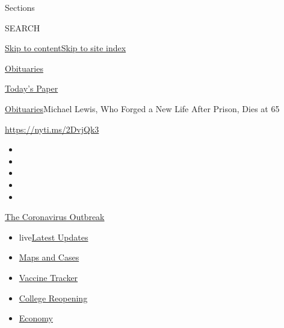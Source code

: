 Sections

SEARCH

\protect\hyperlink{site-content}{Skip to
content}\protect\hyperlink{site-index}{Skip to site index}

\href{https://www.nytimes3xbfgragh.onion/section/obituaries}{Obituaries}

\href{https://myaccount.nytimes3xbfgragh.onion/auth/login?response_type=cookie\&client_id=vi}{}

\href{https://www.nytimes3xbfgragh.onion/section/todayspaper}{Today's
Paper}

\href{/section/obituaries}{Obituaries}\textbar{}Michael Lewis, Who
Forged a New Life After Prison, Dies at 65

\url{https://nyti.ms/2DvjQk3}

\begin{itemize}
\item
\item
\item
\item
\item
\end{itemize}

\href{https://www.nytimes3xbfgragh.onion/news-event/coronavirus?action=click\&pgtype=Article\&state=default\&region=TOP_BANNER\&context=storylines_menu}{The
Coronavirus Outbreak}

\begin{itemize}
\tightlist
\item
  live\href{https://www.nytimes3xbfgragh.onion/2020/08/04/world/coronavirus-covid-19.html?action=click\&pgtype=Article\&state=default\&region=TOP_BANNER\&context=storylines_menu}{Latest
  Updates}
\item
  \href{https://www.nytimes3xbfgragh.onion/interactive/2020/us/coronavirus-us-cases.html?action=click\&pgtype=Article\&state=default\&region=TOP_BANNER\&context=storylines_menu}{Maps
  and Cases}
\item
  \href{https://www.nytimes3xbfgragh.onion/interactive/2020/science/coronavirus-vaccine-tracker.html?action=click\&pgtype=Article\&state=default\&region=TOP_BANNER\&context=storylines_menu}{Vaccine
  Tracker}
\item
  \href{https://www.nytimes3xbfgragh.onion/2020/08/02/us/covid-college-reopening.html?action=click\&pgtype=Article\&state=default\&region=TOP_BANNER\&context=storylines_menu}{College
  Reopening}
\item
  \href{https://www.nytimes3xbfgragh.onion/live/2020/08/03/business/stock-market-today-coronavirus?action=click\&pgtype=Article\&state=default\&region=TOP_BANNER\&context=storylines_menu}{Economy}
\end{itemize}

